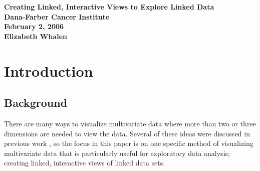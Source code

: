 \documentclass{article}[11pt]
\begin{document}



\begin{titlepage}
\begin{center}
\Large
\vspace*{1in}
\textbf{Creating Linked, Interactive Views to \linebreak Explore Linked Data} \\
\vspace{1in}
\textbf{Dana-Farber Cancer Institute}\\ 
\textbf{February 2, 2006} \\
\vspace{1in} 
\textbf{Elizabeth Whalen} \\
\end{center}
\end{titlepage}
\normalsize
\newpage

\section{Introduction}\label{Sec:Intro}

\subsection{Background}\label{Ssec:Backg}

There are many ways to visualize multivariate data where more than
two or three dimensions are needed to view the data.  Several of these ideas
were discussed in previous work \cite{EW05}, so the focus in this paper
is on one specific method of visualizing multivariate data that is
particularly useful for exploratory data analysis; creating linked,
interactive views of linked data sets.  
\end{document}
